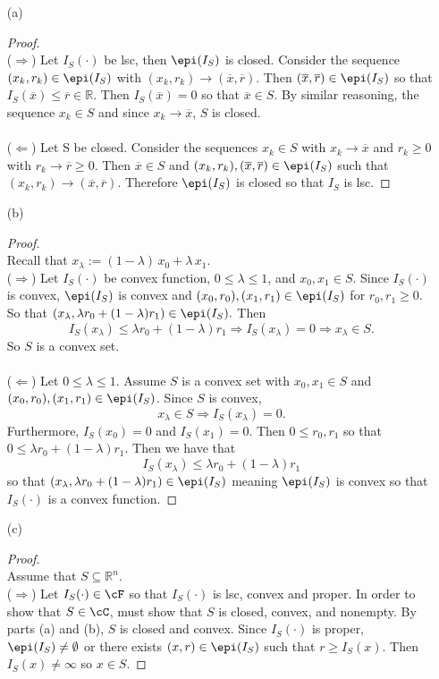 \documentclass[12pt]{article}
\begin{document}
\begin{itemize}
\item[(a)] 
\begin{proof}\quad\\
($\Rightarrow$) 
Let $I_S(\cdot)$ be lsc, then $\epi(I_S)$ is closed. 
Consider the sequence $(x_k,r_k)\in\epi(I_S)$ with $(x_k,r_k)\rightarrow(\overline{x},\overline{r})$.
Then $(\overline{x},\overline{r})\in \epi(I_S)$ so that $I_S(\overline{x})\leq \overline{r}\in \mathbb{R}$.
Then $I_S(\overline{x})=0$ so that $\overline{x}\in S$. By similar reasoning, the sequence $x_k\in S$ and since $x_k\rightarrow\overline{x}$, $S$ is closed.
\\\\
($\Leftarrow$) 
Let S be closed. Consider the sequences $x_k\in S$ with $x_k\rightarrow \overline{x}$ and $r_k\geq 0$ with $r_k\rightarrow \overline{r}\geq 0$. 
Then $\overline{x}\in S$ and $(x_k,r_k),(\overline{x},\overline{r})\in\epi(I_S)$ such that $(x_k,r_k)\rightarrow (\overline{x},\overline{r})$. Therefore $\epi(I_S)$ is closed so that $I_S$ is lsc.
\end{proof}
\item[(b)] 
\begin{proof}\quad\\
Recall that $x_{\lambda}:=(1-\lambda)\,x_0+\lambda\,x_1$.\\
($\Rightarrow$) Let $I_S(\cdot)$ be convex function, $0\leq\lambda\leq 1$, and $x_0,x_1\in S$. 
Since $I_S(\cdot)$ is convex, $\epi(I_S)$ is convex and
$(x_0,r_0),(x_1,r_1)\in \epi(I_S)$ for $r_0,r_1\geq 0$.
So that $(x_\lambda,\lambda r_0+(1-\lambda)r_1)\in \epi(I_S).$ 
Then 
\[
I_S(x_\lambda) \leq \lambda r_0+(1-\lambda)r_1 \Rightarrow
I_S(x_\lambda) = 0 \Rightarrow
x_\lambda \in S.
\]
So $S$ is a convex set. \\\\
($\Leftarrow$) Let $0\leq\lambda\leq 1$. 
Assume $S$ is a convex set with $x_0,x_1\in S$ and $(x_0,r_0),(x_1,r_1)\in\epi(I_S)$.
Since $S$ is convex, $$x_\lambda\in S \Rightarrow I_S(x_\lambda)=0.$$
Furthermore, $I_S(x_0)=0$ and $I_S(x_1)=0$. Then $0 \leq r_0,r_1$ so that $0\leq \lambda r_0 + (1-\lambda)r_1$. 
Then we have that $$I_S(x_\lambda) \leq \lambda r_0 + (1-\lambda)r_1$$ so that
$(x_\lambda, \lambda r_0 + (1-\lambda)r_1)\in \epi(I_S)$ meaning $\epi(I_S)$ is convex so that $I_S(\cdot)$ is a convex function.
\end{proof}

\item[(c)] \begin{proof} \quad \\ Assume that $S\subseteq \mathbb{R}^n$. \\
($\Rightarrow$)  Let $I_S(\cdot)\in\cF$ so that $I_S(\cdot)$ is lsc, convex and proper. In order to show that $S\in\cC$, must show that $S$ is closed, convex, and nonempty. By parts (a) and (b), $S$ is closed and convex. Since $I_S(\cdot)$ is proper, $\epi(I_S)\neq\emptyset$ or there exists $(x,r)\in\epi(I_S)$ such that $r\geq I_S(x)$. Then $I_S(x)\neq\infty$ so $x\in S$. 


\end{proof}
\end{itemize}
\end{document}

